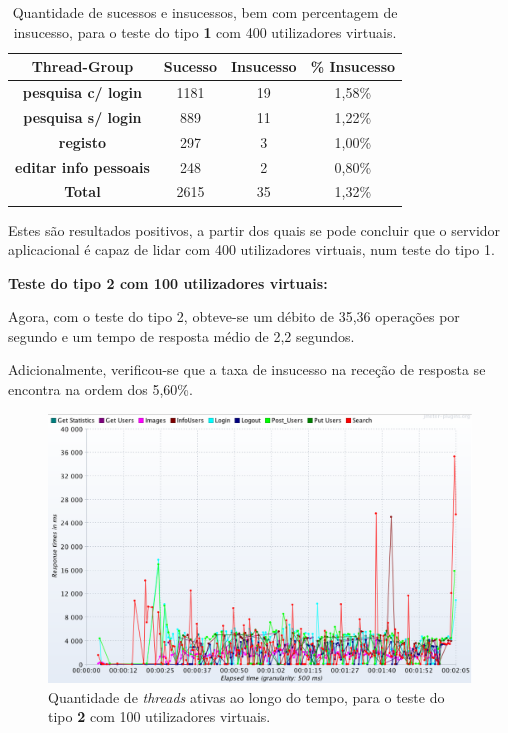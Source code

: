 \begin{table}[H]
\centering
\caption{Quantidade de sucessos e insucessos, bem com percentagem de insucesso, para o teste do tipo \textbf{1} com 400 utilizadores virtuais.}
\begin{tabular}{cccc}
\hline
\rowcolor[HTML]{EFEFEF} 
\textbf{Thread-Group}                  & \textbf{Sucesso} & \textbf{Insucesso} & \textbf{\% Insucesso} \\ \hline
\textbf{pesquisa c/ login}             & 1181             & 19                 & 1,58\%                \\
\textbf{pesquisa s/ login}             & 889              & 11                 & 1,22\%                \\
\textbf{registo}                       & 297              & 3                  & 1,00\%                \\
\textbf{editar info pessoais}          & 248              & 2                  & 0,80\%                \\ \hline
\cellcolor[HTML]{EFEFEF}\textbf{Total} & 2615             & 35                 & 1,32\%                \\ \hline
\end{tabular}
\end{table}

Estes são resultados positivos, a partir dos quais se pode concluir que o servidor aplicacional é capaz de lidar com 400 utilizadores virtuais, num teste do tipo 1.

\vspace{0.5cm}
\noindent\textbf{Teste do tipo 2 com 100 utilizadores virtuais:}


Agora, com o teste do tipo 2, obteve-se um débito de 35,36 operações por segundo e um tempo de resposta médio de 2,2 segundos.

Adicionalmente, verificou-se que a taxa de insucesso na receção de resposta se encontra na ordem dos 5,60\%.


\begin{figure}[H]
    \centering
    \includegraphics[width=1\textwidth]{images/Testes/4PC_RU100R.png}
    \caption{Quantidade de \textit{threads} ativas ao longo do tempo, para o teste do tipo \textbf{2} com 100 utilizadores virtuais.}
    \label{fig:4PC_RU_100_threads}
\end{figure}

